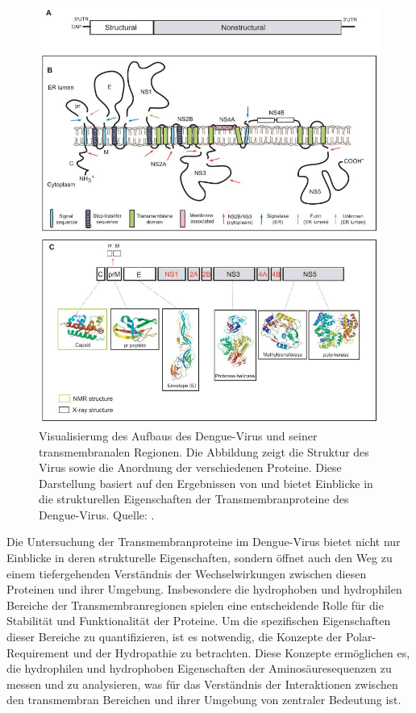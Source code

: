 \documentclass[german,version-2022-01]{uzl-thesis}
\begin{document}
\begin{figure}[tbp]
  \centering
  \includegraphics[scale=1]{Images/Dengue_virus_overview.jpg}
  \caption{Visualisierung des Aufbaus des Dengue-Virus und seiner transmembranalen Regionen. Die Abbildung zeigt die Struktur des Virus sowie die Anordnung der verschiedenen Proteine. Diese Darstellung basiert auf den Ergebnissen von \citeauthor{perera_structural_2008} und bietet Einblicke in die strukturellen Eigenschaften der Transmembranproteine des Dengue-Virus. Quelle:  \cite{perera_structural_2008}.}
  \label{fig:Dengue_virus_overview}
\end{figure} 

Die Untersuchung der Transmembranproteine im Dengue-Virus bietet nicht nur Einblicke in deren strukturelle Eigenschaften, sondern \"offnet auch den Weg zu einem tiefergehenden Verst\"andnis der Wechselwirkungen zwischen diesen Proteinen und ihrer Umgebung. Insbesondere die hydrophoben und hydrophilen Bereiche der Transmembranregionen spielen eine entscheidende Rolle f\"ur die Stabilit\"at und Funktionalit\"at der Proteine. Um die spezifischen Eigenschaften dieser Bereiche zu quantifizieren, ist es notwendig, die Konzepte der Polar-Requirement und der Hydropathie zu betrachten. Diese Konzepte erm\"oglichen es, die hydrophilen und hydrophoben Eigenschaften der Aminos\"auresequenzen zu messen und zu analysieren, was f\"ur das Verst\"andnis der Interaktionen zwischen den transmembran Bereichen und ihrer Umgebung von zentraler Bedeutung ist.
\end{document}
